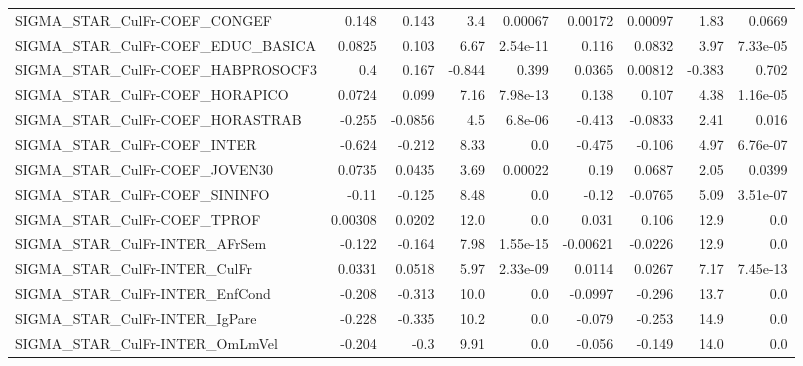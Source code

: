 \begin{tabular}{lrrrrrrrr}
SIGMA\_STAR\_CulFr-COEF\_CONGEF          &       0.148 &        0.143 &      3.4 &  0.00067 &    0.00172 &     0.00097 &         1.83 &        0.0669 \\
SIGMA\_STAR\_CulFr-COEF\_EDUC\_BASICA     &      0.0825 &        0.103 &     6.67 & 2.54e-11 &      0.116 &      0.0832 &         3.97 &      7.33e-05 \\
SIGMA\_STAR\_CulFr-COEF\_HABPROSOCF3     &         0.4 &        0.167 &   -0.844 &    0.399 &     0.0365 &     0.00812 &       -0.383 &         0.702 \\
SIGMA\_STAR\_CulFr-COEF\_HORAPICO        &      0.0724 &        0.099 &     7.16 & 7.98e-13 &      0.138 &       0.107 &         4.38 &      1.16e-05 \\
SIGMA\_STAR\_CulFr-COEF\_HORASTRAB       &      -0.255 &      -0.0856 &      4.5 &  6.8e-06 &     -0.413 &     -0.0833 &         2.41 &         0.016 \\
SIGMA\_STAR\_CulFr-COEF\_INTER           &      -0.624 &       -0.212 &     8.33 &      0.0 &     -0.475 &      -0.106 &         4.97 &      6.76e-07 \\
SIGMA\_STAR\_CulFr-COEF\_JOVEN30         &      0.0735 &       0.0435 &     3.69 &  0.00022 &       0.19 &      0.0687 &         2.05 &        0.0399 \\
SIGMA\_STAR\_CulFr-COEF\_SININFO         &       -0.11 &       -0.125 &     8.48 &      0.0 &      -0.12 &     -0.0765 &         5.09 &      3.51e-07 \\
SIGMA\_STAR\_CulFr-COEF\_TPROF           &     0.00308 &       0.0202 &     12.0 &      0.0 &      0.031 &       0.106 &         12.9 &           0.0 \\
SIGMA\_STAR\_CulFr-INTER\_AFrSem         &      -0.122 &       -0.164 &     7.98 & 1.55e-15 &   -0.00621 &     -0.0226 &         12.9 &           0.0 \\
SIGMA\_STAR\_CulFr-INTER\_CulFr          &      0.0331 &       0.0518 &     5.97 & 2.33e-09 &     0.0114 &      0.0267 &         7.17 &      7.45e-13 \\
SIGMA\_STAR\_CulFr-INTER\_EnfCond        &      -0.208 &       -0.313 &     10.0 &      0.0 &    -0.0997 &      -0.296 &         13.7 &           0.0 \\
SIGMA\_STAR\_CulFr-INTER\_IgPare         &      -0.228 &       -0.335 &     10.2 &      0.0 &     -0.079 &      -0.253 &         14.9 &           0.0 \\
SIGMA\_STAR\_CulFr-INTER\_OmLmVel        &      -0.204 &         -0.3 &     9.91 &      0.0 &     -0.056 &      -0.149 &         14.0 &           0.0 \\

\end{tabular}
